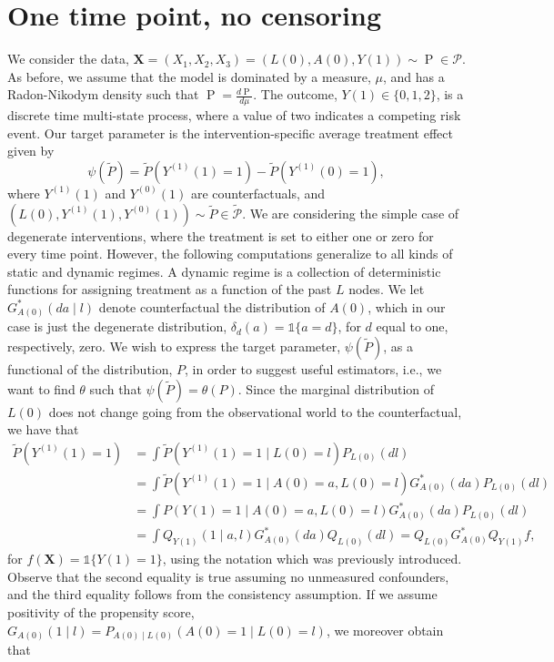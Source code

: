 \documentclass{article}
\newcommand{\A}[1]{A(#1)}
\renewcommand{\L}[1]{L(#1)}
\newcommand{\Y}[1]{Y(#1)}
\newcommand{\Ystar}[2]{Y^{(#1)}(#2)}
\renewcommand{\P}{\ensuremath{\operatorname{P}}}
\begin{document}
\section{One time point, no censoring}
We consider the data, $\textbf{X}=(X_1,X_2,X_3)=(\L{0},\A{0},\Y{1})\sim \P\in\mathcal{P}$. As before, we assume that the model is dominated by a measure, \(\mu\), and has a Radon-Nikodym density such that $\P=\frac{d\P}{d\mu}$. The outcome, $Y(1)\in\{0,1,2\}$, is a discrete time multi-state process, where a value of two indicates a competing risk event. 
Our target parameter is the intervention-specific average treatment effect given by
$$\psi(\tilde{P})=\tilde{P}(\Ystar{1}{1}=1)-\tilde{P}(\Ystar{1}{0}=1),$$
where $\Ystar{1}{1}$ and $\Ystar{0}{1}$ are counterfactuals, and $(\L{0},\Ystar{1}{1},\Ystar{0}{1})\sim\tilde{P}\in\tilde{\mathcal{P}}$. We are considering the simple case of degenerate interventions, where the treatment is set to either one or zero for every time point. However, the following computations generalize to all kinds of static and dynamic regimes. A dynamic regime is a collection of deterministic functions for assigning treatment as a function of the past $L$ nodes. We let $G^*_{\A{0}}(da\mid l)$ denote counterfactual the distribution of $\A{0}$, which in our case is just the degenerate distribution, $\delta_d(a)=\mathds{1}\{a=d\}$, for $d$ equal to one, respectively, zero. We wish to express the target parameter, $\psi(\tilde{P})$, as a functional of the distribution, $P$, in order to suggest useful estimators, i.e., we want to find $\theta$ such that $\psi(\tilde{P})=\theta(P)$. Since the marginal distribution of $\L{0}$ does not change going from the observational world to the counterfactual, we have that
\begin{align*}
    \tilde{P}(\Ystar{1}{1}=1)&=\int\tilde{P}(\Ystar{1}{1}=1\mid \L{0}=l)P_{\L{0}}(dl)\\
    &=\int\tilde{P}(\Ystar{1}{1}=1\mid \A{0}=a,\L{0}=l)G^*_{\A{0}}(da)P_{\L{0}}(dl)\\
    &=\int P(\Y{1}=1\mid \A{0}=a,\L{0}=l)G^*_{\A{0}}(da)P_{\L{0}}(dl)\\
    &=\int Q_{\Y{1}}(1\mid a,l)G^*_{\A{0}}(da)Q_{\L{0}}(dl)=Q_{\L{0}}G^*_{\A{0}}Q_{\Y{1}}f,
\end{align*}
for $f(\textbf{X})=\mathds{1}\{\Y{1}=1\}$, using the notation which was previously introduced. Observe that the second equality is true assuming no unmeasured confounders, and the third equality follows from the consistency assumption. If we assume positivity of the propensity score, $G_{\A{0}}(1\mid l)=P_{\A{0}\mid \L{0}}(\A{0}=1\mid \L{0}=l)$, we moreover obtain that
\end{document}
